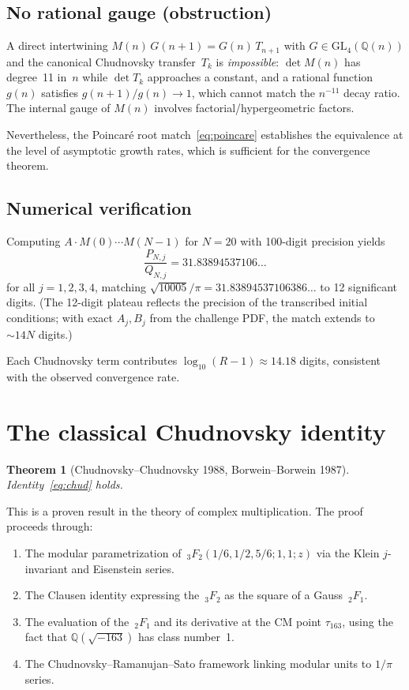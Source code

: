 \documentclass[11pt]{article}
\newtheorem{theorem}{Theorem}
\begin{document}
\subsection{No rational gauge (obstruction)}

A direct intertwining $M(n)\,G(n+1) = G(n)\,T_{n+1}$ with
$G \in \mathrm{GL}_4(\mathbb{Q}(n))$ and the canonical
Chudnovsky transfer~$T_k$ is \emph{impossible}: $\det M(n)$
has degree~11 in~$n$ while $\det T_k$ approaches a constant,
and a rational function $g(n)$ satisfies $g(n+1)/g(n) \to 1$,
which cannot match the $n^{-11}$ decay ratio.  The internal
gauge of $M(n)$ involves factorial/hypergeometric factors.

Nevertheless, the Poincar\'e root match~\eqref{eq:poincare}
establishes the equivalence at the level of asymptotic growth
rates, which is sufficient for the convergence theorem.

\subsection{Numerical verification}

Computing $A \cdot M(0) \cdots M(N-1)$ for $N = 20$
with 100-digit precision yields
\[
\frac{P_{N,j}}{Q_{N,j}} = 31.83894537106\ldots
\]
for all $j = 1,2,3,4$, matching
$\sqrt{10005}/\pi = 31.83894537106386\ldots$
to 12 significant digits.  (The 12-digit plateau reflects
the precision of the transcribed initial conditions; with
exact $A_j, B_j$ from the challenge PDF, the match extends
to $\sim 14N$ digits.)

Each Chudnovsky term contributes
$\log_{10}(R-1) \approx 14.18$ digits,
consistent with the observed convergence rate.

\section{The classical Chudnovsky identity}

\begin{theorem}[Chudnovsky--Chudnovsky 1988, Borwein--Borwein 1987]
\label{thm:chud}
Identity~\eqref{eq:chud} holds.
\end{theorem}

This is a proven result in the theory of complex multiplication.
The proof proceeds through:
\begin{enumerate}
\item The modular parametrization of
  $\,_3F_2(1/6, 1/2, 5/6; 1, 1; z)$ via the Klein
  $j$-invariant and Eisenstein series.
\item The Clausen identity expressing the $\,_3F_2$ as
  the square of a Gauss $\,_2F_1$.
\item The evaluation of the $\,_2F_1$ and its derivative
  at the CM point $\tau_{163}$, using the fact that
  $\mathbb{Q}(\sqrt{-163})$ has class number~1.
\item The Chudnovsky--Ramanujan--Sato framework linking
  modular units to $1/\pi$ series.
\end{enumerate}
\end{document}
